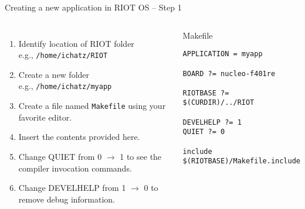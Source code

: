 \documentclass[aspectratio=169]{beamer}
\newcounter{saveenumi}
\newcommand{\seti}{\setcounter{saveenumi}{\value{enumi}}}
\begin{document}
\begin{frame}[fragile]{Creating a new application in RIOT OS -- Step 1} 
\begin{columns}

\begin{enumerate}

\item<1-> Identify location of RIOT folder\\e.g., \alert{\texttt{/home/ichatz/RIOT}}

\item<2-> Create a new folder\\e.g., \alert{\texttt{/home/ichatz/myapp}}

\item<3-> Create a file named \texttt{Makefile} using your favorite editor.

\item<4-> Insert the contents provided here.

\item<5-> Change QUIET from 0 $\rightarrow$ 1 to see the compiler invocation commands. 

\item<6-> Change DEVELHELP from 1 $\rightarrow$ 0 to remove debug information.

\seti

\end{enumerate}

\vspace{-.5cm}
\begin{exampleblock}{Makefile}
\begin{verbatim}
APPLICATION = myapp

BOARD ?= nucleo-f401re

RIOTBASE ?= $(CURDIR)/../RIOT

DEVELHELP ?= 1
QUIET ?= 0

include $(RIOTBASE)/Makefile.include
\end{verbatim}
\end{exampleblock}

\end{columns}
\vspace{5cm}
\end{frame}
\end{document}
